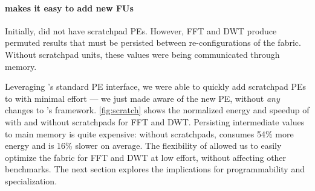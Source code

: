 \paragraph{\snafuframe makes it easy to add new FUs}
Initially, \snafuarch did not have scratchpad PEs.
%
However, FFT and DWT produce permuted results that must be persisted between re-configurations of the fabric.
%
Without scratchpad units, these values were being communicated through memory.

Leveraging \snafuframe's standard PE interface,
we were able to quickly add scratchpad PEs to \snafuarch with minimal effort --- we just made \snafuframe aware of the new PE,
without \emph{any} changes to \snafuframe's framework.
% 
\autoref{fig:scratch} shows the normalized energy and speedup of \snafuarch with and without scratchpads
for FFT and DWT.
%
Persisting intermediate values to main memory is quite expensive:
without scratchpads, \snafuarch consumes 54\% more energy and is 16\% slower on average.
% 
The flexibility of \snafuframe allowed us to easily optimize the \snafuarch fabric for FFT and DWT at low effort, without affecting other benchmarks.
%
The next section explores the implications for programmability and specialization.

